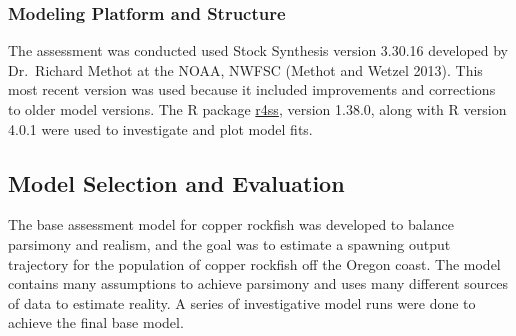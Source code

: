 \documentclass[11pt,
  english,
  a4paper,
]{article}
\begin{document}
\leavevmode\tagmcend\tagstructend\par


\hypertarget{modeling-platform-and-structure}{%
\subsubsection{Modeling Platform and Structure}\label{modeling-platform-and-structure}}

\leavevmode\tagmcend\tagstructend


The assessment was conducted used Stock Synthesis version 3.30.16 developed by Dr.~Richard Methot at the NOAA, NWFSC {(Methot and Wetzel 2013)\leavevmode\tagmcend\tagstructend}. This most recent version was used because it included improvements and corrections to older model versions. The R package {\href{https://github.com/r4ss/r4ss}{r4ss}\leavevmode\tagmcend\tagstructend}, version 1.38.0, along with R version 4.0.1 were used to investigate and plot model fits.

\leavevmode\tagmcend\tagstructend\par


\hypertarget{model-selection-and-evaluation}{%
\subsection{Model Selection and Evaluation}\label{model-selection-and-evaluation}}

\leavevmode\tagmcend\tagstructend


The base assessment model for copper rockfish was developed to balance parsimony and realism, and the goal was to estimate a spawning output trajectory for the population of copper rockfish off the Oregon coast. The model contains many assumptions to achieve parsimony and uses many different sources of data to estimate reality. A series of investigative model runs were done to achieve the final base model.

\leavevmode\tagmcend\tagstructend\par

\end{document}
